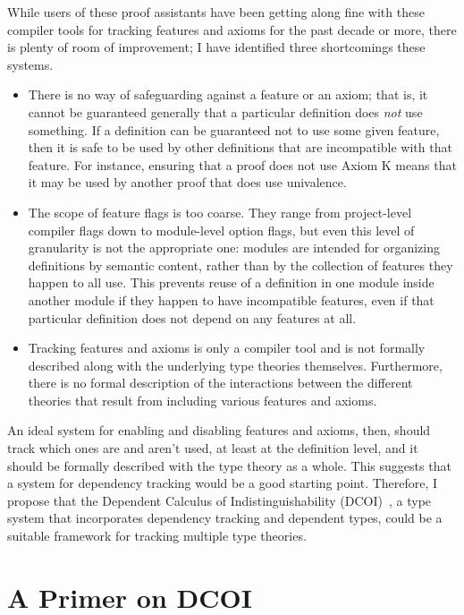 \documentclass{article}
\begin{document}
While users of these proof assistants have been getting along fine
with these compiler tools for tracking features and axioms for the past decade or more,
there is plenty of room of improvement;
I have identified three shortcomings these systems.
%
\begin{itemize}
  \item There is no way of safeguarding against a feature or an axiom;
    that is, it cannot be guaranteed generally that a particular definition
    does \emph{not} use something.
    If a definition can be guaranteed not to use some given feature,
    then it is safe to be used by other definitions
    that are incompatible with that feature.
    For instance, ensuring that a proof does not use Axiom K
    means that it may be used by another proof that does use univalence.
  \item The scope of feature flags is too coarse.
    They range from project-level compiler flags
    down to module-level option flags,
    but even this level of granularity is not the appropriate one:
    modules are intended for organizing definitions by semantic content,
    rather than by the collection of features they happen to all use.
    This prevents reuse of a definition in one module inside another module
    if they happen to have incompatible features,
    even if that particular definition does not depend on any features at all.
  \item Tracking features and axioms is only a compiler tool
    and is not formally described along with the underlying type theories themselves.
    Furthermore, there is no formal description of the interactions between
    the different theories that result from including various features and axioms.
\end{itemize}

An ideal system for enabling and disabling features and axioms, then,
should track which ones are and aren't used, at least at the definition level,
and it should be formally described with the type theory as a whole.
This suggests that a system for dependency tracking would be a good starting point.
Therefore, I propose that the Dependent Calculus of Indistinguishability (DCOI)~\citep{dcoi},
a type system that incorporates dependency tracking and dependent types,
could be a suitable framework for tracking multiple type theories.

\section{A Primer on DCOI} \label{sec:dcoi}
\end{document}
